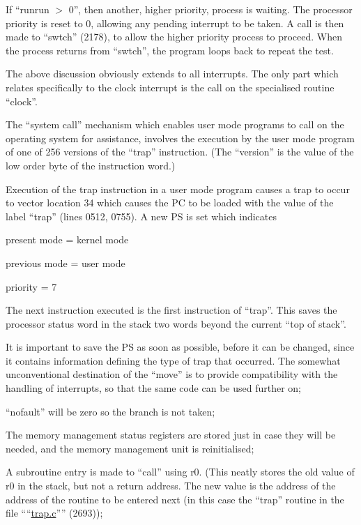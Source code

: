 If ``runrun $>$ 0'', then another, higher
priority, process is waiting. The processor priority is reset to 0, allowing
any pending interrupt to be taken. A
call is then made to ``swtch'' (2178), to
allow the higher priority process to
proceed. When the process returns from
``swtch'', the program loops back to
repeat the test.


The above discussion obviously extends
to all interrupts. The only part which
relates specifically to the clock
interrupt is the call on the specialised routine ``clock''.



The ``system call'' mechanism which
enables user mode programs to call on
the operating system for assistance,
involves the execution by the user mode
program of one of 256 versions of the
``trap'' instruction. (The ``version'' is
the value of the low order byte of the
instruction word.)

\bd
\item[0518:] Execution of the trap instruction in a user mode program
 causes a trap to occur to vector
 location 34 which causes the PC
 to be loaded with the value of
 the label ``trap'' (lines 0512,
 0755). A new PS is set which
 indicates

present mode = kernel mode

previous mode = user mode

priority = 7

\item[0756:] The next instruction executed is
 the first instruction of ``trap''.
 This saves the processor status
 word in the stack two words
 beyond the current ``top of
 stack''.

It is important to save the PS as
soon as possible, before it can
be changed, since it contains
information defining the type of
trap that occurred. The somewhat
unconventional destination of the
``move'' is to provide compatibility with the
handling of interrupts, so that the same code can
be used further on;

\item[0757:] ``nofault'' will be zero so the
 branch is not taken;

\item[0759:] The memory management status
registers are stored just in case
they will be needed, and the
memory management unit is reinitialised;

\item[0762:] A subroutine entry is made to
 ``call'' using r0. (This neatly
 stores the old value of r0 in the
 stack, but not a return address.
 The new value is the address of
 the address of the routine to be
 entered next (in this case the
 ``trap'' routine in the file
 ````\href{./v6/ken/trap.c}{trap.c}'''' (2693));

